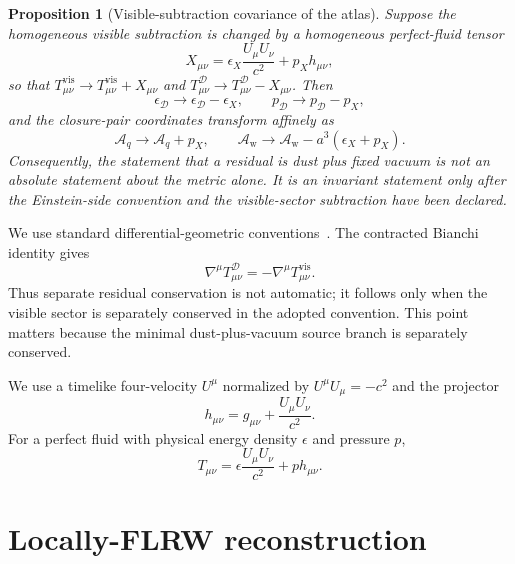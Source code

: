 \documentclass[
  aps,
  prd,
  reprint,
  superscriptaddress,
  floatfix,
  nofootinbib,
  longbibliography
]{revtex4-2}
\theoremstyle{plain}
\newtheorem{proposition}[theorem]{Proposition}
\theoremstyle{definition}
\theoremstyle{remark}
\newcommand{\D}{\mathcal D}
\newcommand{\vis}{\mathrm{vis}}
\newcommand{\Aq}{\mathcal A_q}
\newcommand{\Aw}{\mathcal A_{\mathrm w}}
\newcommand{\eps}{\epsilon}
\begin{document}
\begin{proposition}[Visible-subtraction covariance of the atlas]
\label{prop:atlas_subtraction_covariance_v26}
Suppose the homogeneous visible subtraction is changed by a homogeneous
perfect-fluid tensor
\begin{equation}
X_{\mu\nu}=\eps_X\frac{U_\mu U_\nu}{c^2}+p_X h_{\mu\nu},
\end{equation}
so that \(T^{\vis}_{\mu\nu}\to T^{\vis}_{\mu\nu}+X_{\mu\nu}\) and
\(T^\D_{\mu\nu}\to T^\D_{\mu\nu}-X_{\mu\nu}\).  Then
\begin{equation}
\eps_\D\to \eps_\D-\eps_X,
\qquad
p_\D\to p_\D-p_X,
\end{equation}
and the closure-pair coordinates transform affinely as
\begin{equation}
\boxed{
\Aq\to \Aq+p_X,
\qquad
\Aw\to \Aw-a^3(\eps_X+p_X) .
}
\label{eq:atlas_affine_subtraction_v26}
\end{equation}
Consequently, the statement that a residual is dust plus fixed vacuum is not an
absolute statement about the metric alone.  It is an invariant statement only
after the Einstein-side convention and the visible-sector subtraction have been
declared.
\end{proposition}

We use standard differential-geometric conventions~\cite{Wald}.  The contracted Bianchi identity gives
\begin{equation}
\nabla^\mu T^\D_{\mu\nu}=-\nabla^\mu T^{\vis}_{\mu\nu} .
\label{eq:bianchi_residual_v5}
\end{equation}
Thus separate residual conservation is not automatic; it follows only when the
visible sector is separately conserved in the adopted convention.  This point
matters because the minimal dust-plus-vacuum source branch is separately
conserved.

We use a timelike four-velocity \(U^\mu\) normalized by
\(U^\mu U_\mu=-c^2\) and the projector
\begin{equation}
h_{\mu\nu}=g_{\mu\nu}+\frac{U_\mu U_\nu}{c^2} .
\label{eq:projector_v5}
\end{equation}
For a perfect fluid with physical energy density \(\eps\) and pressure \(p\),
\begin{equation}
T_{\mu\nu}=\eps\frac{U_\mu U_\nu}{c^2}+p h_{\mu\nu} .
\label{eq:perfect_fluid_v5}
\end{equation}

\section{Locally-FLRW reconstruction}
\end{document}
